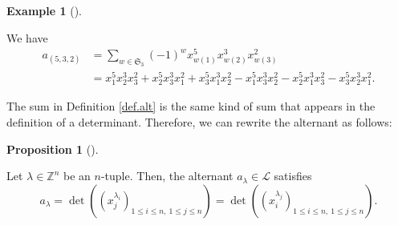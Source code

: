 \documentclass[numbers=enddot,12pt,final,onecolumn,notitlepage]{scrartcl}%
\theoremstyle{definition}
\newtheorem{prop}[theo]{Proposition}
\newenvironment{proposition}[1][]
{\begin{prop}[#1]\begin{leftbar}}
{\end{leftbar}\end{prop}}
\newtheorem{exam}[theo]{Example}
\newenvironment{example}[1][]
{\begin{exam}[#1]\begin{leftbar}}
{\end{leftbar}\end{exam}}
\let\sumnonlimits\sum
\renewcommand{\sum}{\sumnonlimits\limits}
\begin{document}
\begin{example}
We have%
\begin{align*}
a_{\left(  5,3,2\right)  }  &  =\sum_{w\in\mathfrak{S}_{3}}\left(  -1\right)
^{w}x_{w\left(  1\right)  }^{5}x_{w\left(  2\right)  }^{3}x_{w\left(
3\right)  }^{2}\\
&  =x_{1}^{5}x_{2}^{3}x_{3}^{2}+x_{2}^{5}x_{3}^{3}x_{1}^{2}+x_{3}^{5}x_{1}%
^{3}x_{2}^{2}-x_{1}^{5}x_{3}^{3}x_{2}^{2}-x_{2}^{5}x_{1}^{3}x_{3}^{2}%
-x_{3}^{5}x_{2}^{3}x_{1}^{2}.
\end{align*}

\end{example}

The sum in Definition \ref{def.alt} is the same kind of sum that appears in
the definition of a determinant. Therefore, we can rewrite the alternant as follows:

\begin{proposition}
\label{prop.alt}Let $\lambda\in\mathbb{Z}^{n}$ be an $n$-tuple. Then, the
alternant $a_{\lambda}\in\mathcal{L}$ satisfies%
\[
a_{\lambda}=\det\left(  \left(  x_{j}^{\lambda_{i}}\right)  _{1\leq i\leq
n,\ 1\leq j\leq n}\right)  =\det\left(  \left(  x_{i}^{\lambda_{j}}\right)
_{1\leq i\leq n,\ 1\leq j\leq n}\right)  .
\]

\end{proposition}
\end{document}
